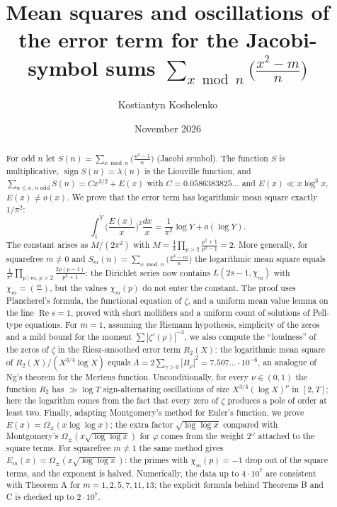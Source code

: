 \documentclass[11pt]{amsart}
\title[Mean squares and oscillations for Jacobi-symbol sums]{Mean squares and oscillations of the error term for the Jacobi-symbol sums $\sum_{x \bmod n}\big(\tfrac{x^2-m}{n}\big)$}
\author{Kostiantyn Koshelenko}
\date{November 2026}
\theoremstyle{remark}
\begin{document}
\begin{abstract}
For odd $n$ let $S(n)=\sum_{x\bmod n}\big(\frac{x^2-1}{n}\big)$ (Jacobi symbol). The function $S$ is multiplicative, $\operatorname{sign}S(n)=\lambda(n)$ is the Liouville function, and $\sum_{n\le x,\,n\text{ odd}}S(n)=Cx^{3/2}+E(x)$ with $C=0.0586383825\ldots$ and $E(x)\ll x\log^3x$, $E(x)\neq o(x)$. We prove that the error term has logarithmic mean square exactly $1/\pi^2$:
\[
\int_1^Y\Big(\frac{E(x)}{x}\Big)^2\frac{dx}{x}=\frac{1}{\pi^2}\log Y+o(\log Y).
\]
The constant arises as $M/(2\pi^2)$ with $M=\tfrac43\prod_{p>2}\frac{p^2+1}{p^2-1}=2$. More generally, for squarefree $m\neq0$ and $S_m(n)=\sum_{x\bmod n}\big(\frac{x^2-m}{n}\big)$ the logarithmic mean square equals $\frac1{\pi^2}\prod_{p\mid m,\,p>2}\frac{2p(p-1)}{p^2+1}$: the Dirichlet series now contains $L(2s-1,\chi_m)$ with $\chi_m=(\frac m\cdot)$, but the values $\chi_m(p)$ do not enter the constant. The proof uses Plancherel's formula, the functional equation of $\zeta$, and a uniform mean value lemma on the line $\operatorname{Re}s=1$, proved with short mollifiers and a uniform count of solutions of Pell-type equations. For $m=1$, assuming the Riemann hypothesis, simplicity of the zeros and a mild bound for the moment $\sum|\zeta'(\rho)|^{-3}$, we also compute the ``loudness'' of the zeros of $\zeta$ in the Riesz-smoothed error term $R_2(X)$: the logarithmic mean square of $R_2(X)/(X^{3/4}\log X)$ equals $\Lambda=2\sum_{\gamma>0}|B_\rho|^2=7.507\ldots\cdot10^{-6}$, an analogue of Ng's theorem for the Mertens function. Unconditionally, for every $\nu\in(0,1)$ the function $R_2$ has $\gg\log T$ sign-alternating oscillations of size $X^{3/4}(\log X)^\nu$ in $[2,T]$; here the logarithm comes from the fact that every zero of $\zeta$ produces a pole of order at least two. Finally, adapting Montgomery's method for Euler's function, we prove $E(x)=\Omega_\pm(x\log\log x)$; the extra factor $\sqrt{\log\log x}$ compared with Montgomery's $\Omega_\pm(x\sqrt{\log\log x})$ for $\varphi$ comes from the weight $2^{\omega}$ attached to the square terms. For squarefree $m\neq1$ the same method gives $E_m(x)=\Omega_\pm(x\sqrt{\log\log x})$: the primes with $\chi_m(p)=-1$ drop out of the square terms, and the exponent is halved. Numerically, the data up to $4\cdot10^7$ are consistent with Theorem A for $m=1,2,5,7,11,13$; the explicit formula behind Theorems B and C is checked up to $2\cdot10^7$.
\end{abstract}

\maketitle
\end{document}
